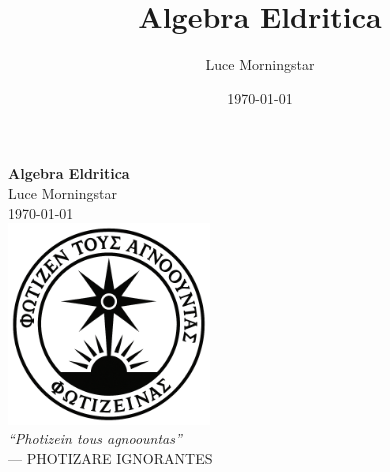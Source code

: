 \documentclass[12pt]{book}
\title{Algebra Eldritica}
\author{Luce Morningstar}
\date{\today}
\begin{document}
\pagestyle{fancy}
\fancyhf{}
\lhead{\leftmark}
\rhead{\thepage}
\renewcommand{\headrulewidth}{0.4pt}
\renewcommand{\footrulewidth}{0pt}

\begin{titlepage}
    \centering
    \vspace*{2.5cm}
    {\Huge\bfseries Algebra Eldritica \\[0.5em]}
    {\LARGE Luce Morningstar}\\[0.5cm]
    {\large \today}\\[3cm]
    \includegraphics[width=0.4\textwidth]{images/morningstar.png}\\[1cm]
    {\Large\itshape \textquotedblleft Photizein tous agnoountas\textquotedblright}\\
    {\large — PHOTIZARE IGNORANTES}
    \vfill
\end{titlepage}


\end{document}
